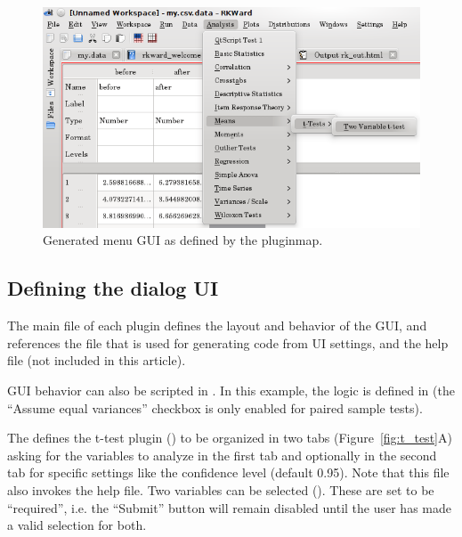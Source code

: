 \begin{figure}[htp]
 \centering
 \includegraphics{../figures/ttest-gui-example.png}
 \caption{Generated menu GUI as defined by the pluginmap.}
 \label{fig:ttest-gui-example}
\end{figure}


\subsection {Defining the dialog UI}
\label{sec:defining_dialog_ui}
The main  file of each plugin defines the layout and behavior of the GUI, and references the
 file that is used for generating  code from UI settings, and the help file (not included in this article).

GUI behavior can also be scripted in . In this example, the logic is defined in  (the ``Assume equal variances'' checkbox
is only enabled for paired sample tests).

The  defines the t-test plugin () to be organized in two tabs (Figure~\ref{fig:t_test}A) asking for the variables
to analyze in the first tab and optionally in the second tab for specific settings like the confidence level (default 0.95). Note that this  file
also invokes the  help file. Two variables can be selected (). These are set to be ``required'', i.e.
the ``Submit'' button will remain disabled until the user has made a valid selection for both.


